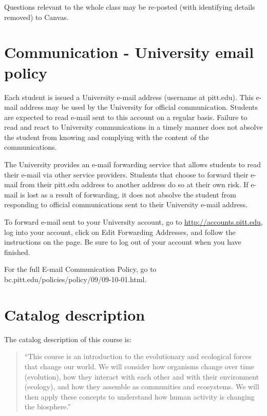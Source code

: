 \documentclass[
]{book}
\begin{document}
Questions relevant to the whole class may be re-posted (with identifying details removed) to Canvas.

\hypertarget{communication---university-email-policy}{%
\chapter{Communication - University email policy}\label{communication---university-email-policy}}

Each student is issued a University e-mail address (username at pitt.edu). This e-mail address may be used by the University for official communication. Students are expected to read e-mail sent to this account on a regular basis. Failure to read and react to University communications in a timely manner does not absolve the student from knowing and complying with the content of the communications.

The University provides an e-mail forwarding service that allows students to read their e-mail via other service providers. Students that choose to forward their e-mail from their pitt.edu address to another address do so at their own risk. If e-mail is lost as a result of forwarding, it does not absolve the student from responding to official communications sent to their University e-mail address.

To forward e-mail sent to your University account, go to \url{http://accounts.pitt.edu}, log into your account, click on Edit Forwarding Addresses, and follow the instructions on the page. Be sure to log out of your account when you have finished.

For the full E-mail Communication Policy, go to bc.pitt.edu/policies/policy/09/09-10-01.html.

\hypertarget{catalog-description}{%
\chapter{Catalog description}\label{catalog-description}}

The catalog description of this course is:

\begin{quote}
``This course is an introduction to the evolutionary and ecological forces that change our world. We will consider how organisms change over time (evolution), how they interact with each other and with their environment (ecology), and how they assemble as communities and ecosystems. We will then apply these concepts to understand how human activity is changing the biosphere.''
\end{quote}
\end{document}
